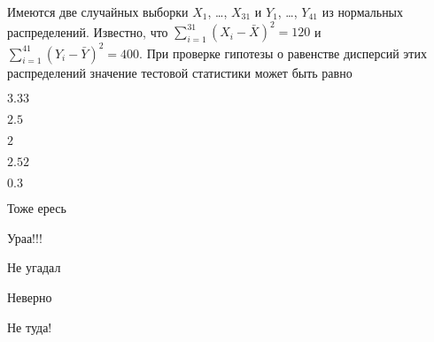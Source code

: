 
\begin{question}
Имеются две случайных выборки \(X_1\), \ldots, \(X_{31}\) и \(Y_1\),
\ldots, \(Y_{41}\) из нормальных распределений. Известно, что
\(\sum_{i=1}^{31}(X_i - \bar X)^2 = 120\) и
\(\sum_{i=1}^{41}(Y_i - \bar Y)^2 = 400\). При проверке гипотезы о
равенстве дисперсий этих распределений значение тестовой статистики
может быть равно
\begin{answerlist}
  \item \(3.33\)
  \item \(2.5\)
  \item \(2\)
  \item \(2.52\)
  \item \(0.3\)
\end{answerlist}
\end{question}

\begin{solution}
\begin{answerlist}
  \item Тоже ересь
  \item Ураа!!!
  \item Не угадал
  \item Неверно
  \item Не туда!
\end{answerlist}
\end{solution}

